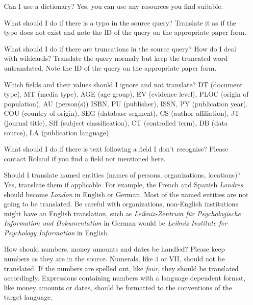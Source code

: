 \documentclass[a4paper,10pt]{article}
\newenvironment{faq}{\begin{description}[style=nextline]}{\end{description}}
\newcommand{\cris}[1]{{\color{red}{#1}}}
\begin{document}
\begin{faq}

  \item[Can I use a dictionary?]
 Yes, you can use any resources you find suitable.
  
  \item[What should I do if there is a typo in the source query?]
    Translate it as if the typo does not exist and note the ID of the query on the appropriate paper form.

  \item[What should I do if there are truncations in the source query? How do I deal with wildcards?]
    Translate the query normaly but keep the truncated word untranslated. Note the ID of the query on the appropriate paper form.


    
  \item[Which fields and their values should I ignore and not translate?]
  DT (document type), MT (media type), AGE (age group), EV (evidence level), PLOC (origin of population), AU (person(s))
  ISBN, PU (publisher), ISSN, PY (publication year), COU (country of origin), SEG (database segment), CS (author affiliation), JT (journal title), SH (subject classification), CT (controlled term), DB (data source), LA (publication language)
  
  \item[What should I do if there is text following a field I don't recognise?]
    Please contact Roland if you find a field not mentioned here.
    
  \item[Should I translate named entities (names of persons, organizations, locations)?]
Yes, translate them if applicable. For example, the French and Spanish \textit{Londres} should become \textit{London} in English or German. Most of the named entities are not going to be translated. Be careful with organizations, non-English institutions might have an English translation, such as \textit{Leibniz-Zentrum f\"ur Psychologische Information und Dokumentation} in German would be \textit{Leibniz Institute for Psychology Information} in English. 

\item[How should numbers, money amounts and dates be handled?]
Please keep numbers as they are in the source. Numerals, like 4 or VII, should not be translated. If the numbers are spelled out, like \emph{four}, they should be translated accordingly. Expressions containing numbers with a language dependent format, like money amounts or dates, should be formatted to the conventions of the target language.
    
\end{faq}
\end{document}
